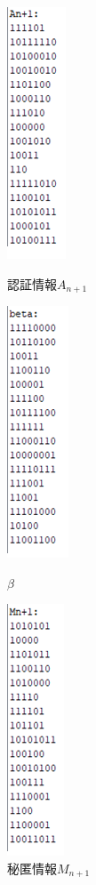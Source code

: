 \begin{figure}[H]
\begin{minipage}{0.33\hsize}
\centering
\includegraphics{beta_Am.png}
\caption{認証情報$A_{n+1}$}
\label{fig:beta_Am}
\end{minipage}
\begin{minipage}{0.33\hsize}
\centering
\includegraphics{beta.png}
\caption{$\beta$}
\label{fig:beta}
\end{minipage}
\begin{minipage}{0.33\hsize}
\centering
\includegraphics{ninsyo_Mm.png}
\caption{秘匿情報$M_{n+1}$}
\label{fig:ninsyo_Mm}
\end{minipage}
\end{figure}


